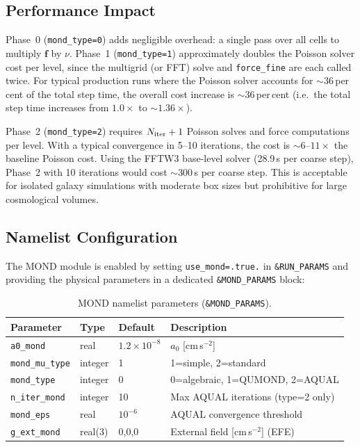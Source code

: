 \documentclass[fleqn,usenatbib]{mnras}
\newcommand{\code}[1]{\texttt{#1}}
\newcommand{\azero}{a_0}
\begin{document}
\subsection{Performance Impact}
\label{sec:mond_perf}

Phase~0 (\code{mond\_type=0}) adds negligible overhead: a single pass
over all cells to multiply $\mathbf{f}$ by $\nu$.  Phase~1
(\code{mond\_type=1}) approximately doubles the Poisson solver cost
per level, since the multigrid (or FFT) solve and \code{force\_fine}
are each called twice.  For typical production runs where the Poisson
solver accounts for ${\sim}36$\,per\,cent of the total step time, the
overall cost increase is ${\sim}36$\,per\,cent (i.e.\ the total step
time increases from $1.0\times$ to ${\sim}1.36\times$).

Phase~2 (\code{mond\_type=2}) requires $N_{\rm iter}+1$ Poisson
solves and force computations per level.  With a typical convergence
in 5--10 iterations, the cost is ${\sim}6$--$11\times$ the baseline
Poisson cost.  Using the FFTW3 base-level solver (28.9\,s per
coarse step), Phase~2 with 10 iterations would cost ${\sim}300$\,s
per coarse step.  This is acceptable for isolated galaxy simulations
with moderate box sizes but prohibitive for large cosmological volumes.

\subsection{Namelist Configuration}
\label{sec:mond_namelist}

The MOND module is enabled by setting \code{use\_mond=.true.} in
\code{\&RUN\_PARAMS} and providing the physical parameters in a
dedicated \code{\&MOND\_PARAMS} block:

\begin{table}
\centering
\caption{MOND namelist parameters (\code{\&MOND\_PARAMS}).}
\label{tab:mond_params}
\small
\begin{tabular}{llll}
\toprule
Parameter & Type & Default & Description \\
\midrule
\code{a0\_mond}      & real    & $1.2\times10^{-8}$ & $\azero$ [cm\,s$^{-2}$] \\
\code{mond\_mu\_type} & integer & 1 & 1=simple, 2=standard \\
\code{mond\_type}     & integer & 0 & 0=algebraic, 1=QUMOND, 2=AQUAL \\
\code{n\_iter\_mond}  & integer & 10 & Max AQUAL iterations (type=2 only) \\
\code{mond\_eps}      & real    & $10^{-6}$ & AQUAL convergence threshold \\
\code{g\_ext\_mond}   & real(3) & 0,0,0 & External field [cm\,s$^{-2}$] (EFE) \\
\bottomrule
\end{tabular}
\end{table}
\end{document}
